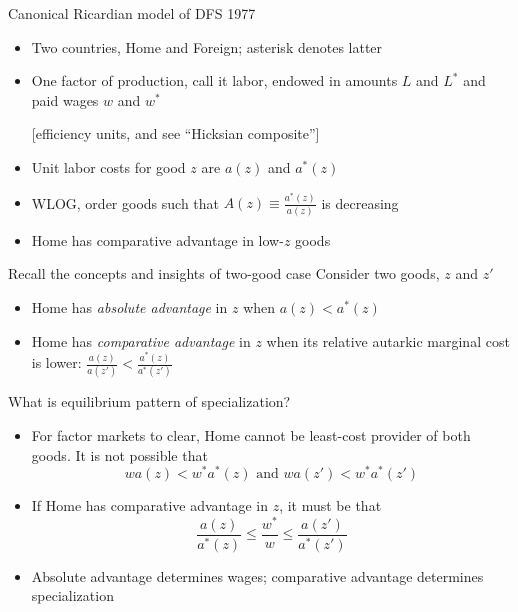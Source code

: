 \documentclass[11pt,notes=hide,aspectratio=169]{beamer}
\begin{document}
\begin{frame}{Canonical Ricardian model of DFS 1977}
\begin{itemize}
	\item Two countries, Home and Foreign; asterisk denotes latter
	\item One factor of production, call it labor, endowed in amounts $L$ and $L^*$ and paid wages $w$ and $w^*$
	\item[] [efficiency units, and see ``Hicksian composite'']
	\item Unit labor costs for good $z$ are $a(z)$ and $a^*(z)$
	\item WLOG, order goods such that $A(z) \equiv \frac{a^*(z)}{a(z)}$ is decreasing
	\item Home has comparative advantage in low-$z$ goods
\end{itemize}
\end{frame}
\begin{frame}{Recall the concepts and insights of two-good case}
Consider two goods, $z$ and $z'$
\begin{itemize}
	\item Home has \textit{absolute advantage} in $z$ when $a(z) < a^*(z)$
	\item Home has \textit{comparative advantage} in $z$ when its relative autarkic marginal cost is lower: $\frac{a(z)}{a(z')} < \frac{a^*(z)}{a^*(z')}$
\end{itemize}
What is equilibrium pattern of specialization?
\begin{itemize}
	\item For factor markets to clear, Home cannot be least-cost provider of both goods. It is not possible that
	\begin{equation*}w a(z) < w^{*}a^{*}(z) \text{ and } w a(z') < w^*a^*(z')\end{equation*}
	\item If Home has comparative advantage in $z$, it must be that 
	\begin{equation*}\frac{a(z)}{a^*(z)} \leq \frac{w^{*}}{w} \leq \frac{a(z')}{a^*(z')}\end{equation*}
	\item Absolute advantage determines wages; comparative advantage determines specialization
\end{itemize}
\end{frame}
\end{document}
